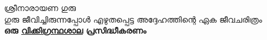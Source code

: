 \documentclass[12pt,openany]{book}
\begin{document}
	\newpage
	\thispagestyle{empty}
	\mbox{}
	
	\newpage
	\thispagestyle{empty}
	\mbox{}
	
	\newpage
	\thispagestyle{empty}
	
	\vspace*{\fill} %
	
	\begin{flushright}
		\large
		{\LARGE ശ്രീനാരായണ ഗുരു} \\
		ഗുരു ജീവിച്ചിരുന്നപ്പോൾ എഴുതപ്പെട്ട അദ്ദേഹത്തിന്റെ ഏക ജീവചരിത്രം \\[2\baselineskip]
		\textbf{ഒരു \href{URL}{വിക്കിഗ്രന്ഥശാല} പ്രസിദ്ധീകരണം}
	\end{flushright}
	
	\vspace*{2cm} %
	
\end{document}

